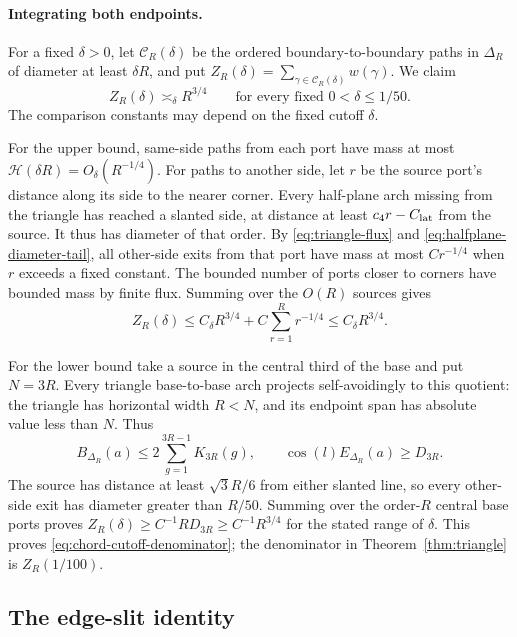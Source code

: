 \paragraph{Integrating both endpoints.}
For a fixed $\delta>0$, let $\mathcal C_R(\delta)$ be the ordered
boundary-to-boundary paths in $\Delta_R$ of diameter at least $\delta R$,
and put $Z_R(\delta)=\sum_{\gamma\in\mathcal C_R(\delta)}w(\gamma)$.
We claim
\begin{equation}\label{eq:chord-cutoff-denominator}
 Z_R(\delta)\asymp_\delta R^{3/4}
 \qquad\text{for every fixed }0<\delta\le1/50.
\end{equation}
The comparison constants may depend on the fixed cutoff $\delta$.

For the upper bound, same-side paths from each port have mass at most
$\mathcal H(\delta R)=O_\delta(R^{-1/4})$. For paths to another side,
let $r$ be the source port's distance along its side to the nearer
corner. Every half-plane arch missing from the triangle has reached a
slanted side, at distance at least $c_4r-C_{\rm lat}$ from the source.
It thus has diameter of that order. By
\eqref{eq:triangle-flux} and \eqref{eq:halfplane-diameter-tail}, all
other-side exits from that port have mass at most $Cr^{-1/4}$ when
$r$ exceeds a fixed constant. The bounded number of ports closer to
corners have bounded mass by finite flux. Summing over the $O(R)$
sources gives
\[
 Z_R(\delta)\le C_\delta R^{3/4}
             +C\sum_{r=1}^{R}r^{-1/4}
       \le C_\delta R^{3/4}.
\]

For the lower bound take a source in the central third of the base and
put $N=3R$. Every triangle base-to-base arch projects self-avoidingly to
this quotient: the triangle has horizontal width $R<N$, and its endpoint
span has absolute value less than $N$. Thus
\[
 B_{\Delta_R}(a)\le2\sum_{g=1}^{3R-1}K_{3R}(g),\qquad
 \cos(l)E_{\Delta_R}(a)\ge D_{3R}.
\]
The source has distance at least $\sqrt3R/6$ from either slanted line,
so every other-side exit has diameter greater than $R/50$. Summing over
the order-$R$ central base ports proves
$Z_R(\delta)\ge C^{-1} R D_{3R}\ge C^{-1}R^{3/4}$ for the stated range of
$\delta$. This proves \eqref{eq:chord-cutoff-denominator}; the
denominator in Theorem~\ref{thm:triangle} is $Z_R(1/100)$.

\subsection{The edge-slit identity}

